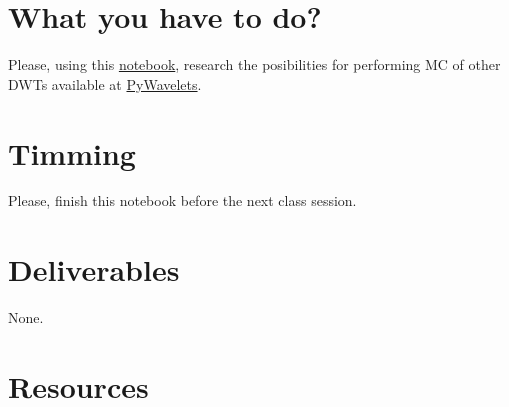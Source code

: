 \section{What you have to do?}
  
Please, using this
\href{https://github.com/Sistemas-Multimedia/Sistemas-Multimedia.github.io/blob/master/study_guide/10-MC_in_DWT_domain/DWT_shift_variance.ipynb}{notebook},
research the posibilities for performing MC of other DWTs available at
\href{https://pywavelets.readthedocs.io/en/latest/}{PyWavelets}.

\section{Timming}

Please, finish this notebook before the next class session.

\section{Deliverables}

None.

\section{Resources}


